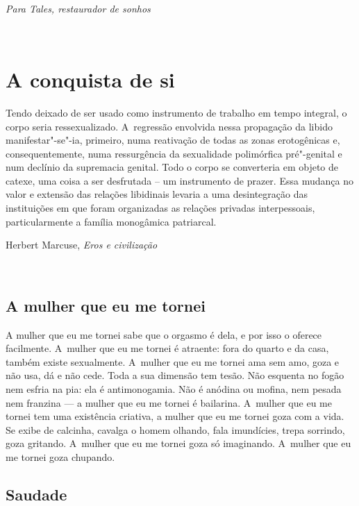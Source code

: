 ​

\lonelyepigraph{}

\epigraph{\emph{Para Tales, restaurador de sonhos}}{}

 

\part{A conquista de si}

\lonelyepigraph{}

\epigraph{Tendo deixado de ser usado como instrumento de trabalho em tempo
integral, o corpo seria ressexualizado. A~regressão envolvida nessa propagação
da libido manifestar"-se"-ia, primeiro, numa reativação de todas as zonas
erotogênicas e, consequentemente, numa ressurgência da sexualidade polimórfica
pré"-genital e num declínio da supremacia genital. Todo o corpo se converteria
em objeto de catexe, uma coisa a ser desfrutada – um instrumento de prazer.
Essa mudança no valor e extensão das relações libidinais levaria a uma
desintegração das instituições em que foram organizadas as relações privadas
interpessoais, particularmente a família monogâmica patriarcal.}{Herbert
Marcuse, \emph{Eros e civilização}}



​

\epigraph{}{} 

\chapter{A mulher que eu me tornei}

A mulher que eu me tornei sabe que o orgasmo é dela, e por isso o
oferece facilmente. A~mulher que eu me tornei é atraente: fora do quarto
e da casa, também existe sexualmente. A~mulher que eu me tornei ama sem
amo, goza e não usa, dá e não cede.{} Toda a sua dimensão tem
tesão.{} Não esquenta no fogão nem esfria na pia: ela é
antimonogamia. Não é anódina ou mofina, nem pesada nem franzina --- a
mulher que eu me tornei é bailarina. A~mulher que eu me tornei tem uma
existência criativa, a mulher que eu me tornei goza com a vida. Se exibe
de calcinha, cavalga o homem olhando, fala imundícies, trepa sorrindo,
goza gritando. A~mulher que eu me tornei goza só imaginando. A~mulher
que eu me tornei goza chupando.

\chapter{Saudade}


